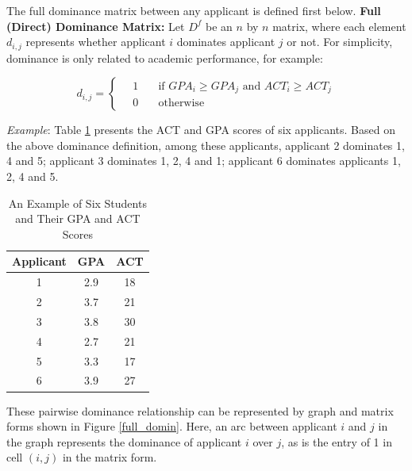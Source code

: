 \documentclass[12pt,english]{report}
\begin{document}
The full dominance matrix between any applicant is defined first below.
\textbf{Full (Direct) Dominance Matrix:} Let $D^{f}$ be an $n$ by $n$ matrix,
where each
element $d_{i,j}$ represents whether applicant $i$ dominates applicant $j$ or
not. For
simplicity,  dominance is only related to academic
performance, for example:

\begin{equation}
   d_{i,j} =
  \begin{cases}
\quad   1   & \quad \mbox{if }  GPA_i \geq GPA_j \mbox{ and }  ACT_i \geq ACT_j
\\
  \quad   0  & \quad \mbox{otherwise}
  \end{cases}	
\end{equation}

\noindent \textit{Example}:  Table \ref{student_sample} presents the ACT and
GPA scores of six applicants.  Based on the above dominance definition, among
these applicants, applicant 2 dominates 1, 4 and 5; applicant 3 dominates 1, 2,
4 
and 1; applicant 6 dominates applicants 1, 2, 4 and 5.


\begin{table}[ht!]
\centering
\begin{tabular}{|c|c|c|}
\hline
  Applicant & GPA & ACT \\ [0.5ex] 
\hline
1 & 2.9 & 18 \\ \hline
2 & 3.7 & 21 \\ \hline
3 & 3.8 & 30 \\ \hline
4 & 2.7 & 21 \\ \hline
5 & 3.3 & 17 \\ \hline
6 & 3.9 & 27 \\ \hline
\end{tabular}
\caption{An Example of Six Students and Their GPA and ACT Scores} 
\label{student_sample}
\end{table}

These pairwise dominance relationship can be represented by graph and matrix
forms shown in Figure \ref{full_domin}. Here, an arc between applicant $i$ and
$j$ in the graph represents the dominance of applicant $i$ over $j$,  as is the
entry of 1 in cell $(i,j)$ in the matrix form.
\end{document}

